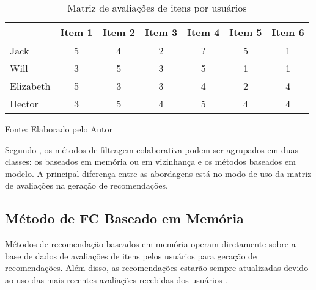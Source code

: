     \begin{table}[htb]
        
        \caption{Matriz de avaliações de itens por usuários}
        \label{tab:matriz-av-item-user}
        \begin{tabular}{@{}lcccccc@{}}
        \toprule
                  & Item 1 & Item 2 & Item 3 & Item 4 & Item 5 & Item 6 \\ \midrule
        Jack      & 5      & 4      & 2      & ?      & 5      & 1      \\
        Will      & 3      & 5      & 3      & 5      & 1      & 1      \\
        Elizabeth & 5      & 3      & 3      & 4      & 2      & 4      \\
        Hector    & 3      & 5      & 4      & 5      & 4      & 4      \\ \bottomrule
        \end{tabular}
        
        \footnotesize{Fonte: Elaborado pelo Autor}
    \end{table}
    
    Segundo , os métodos de filtragem colaborativa podem ser agrupados em duas classes: os baseados em memória ou em vizinhança e os métodos baseados em modelo. A principal diferença entre as abordagens está no modo de uso da matriz de avaliações na geração de recomendações. 
    
    
        
    \subsection{Método de FC Baseado em Memória}
        
        Métodos de recomendação baseados em memória operam diretamente sobre a base de dados de avaliações de itens pelos usuários para geração de recomendações. Além disso, as recomendações estarão sempre atualizadas devido ao uso das mais recentes avaliações recebidas dos usuários \cite{Bobadilla_2013}. 
        
        
